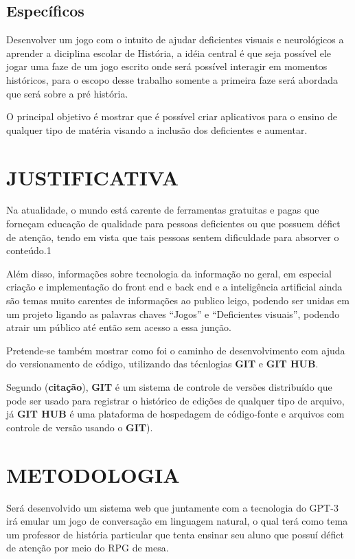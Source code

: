 \subsection{Específicos}
\label{sec:Especificos}
Desenvolver um jogo com o intuito de ajudar deficientes visuais e neurológicos a aprender a diciplina escolar de História, a idéia central é que seja possível ele jogar uma faze de um jogo escrito onde será possível interagir em momentos históricos, para o escopo desse trabalho somente a primeira faze será abordada que será sobre a pré história. 

O principal objetivo é mostrar que é possível criar aplicativos para o ensino de qualquer tipo de matéria visando a inclusão dos deficientes e aumentar.

\section{JUSTIFICATIVA}
\label{sec:Justificativa}

Na atualidade, o mundo está carente de ferramentas gratuitas e pagas que forneçam educação de qualidade para pessoas deficientes ou que possuem défict de atenção, tendo em vista que tais pessoas sentem dificuldade para absorver o conteúdo.1 

Além disso, informações sobre tecnologia da informação no geral, em especial criação e implementação do front end e back end e a inteligência artificial ainda são temas muito carentes de informações ao publico leigo, podendo ser unidas em um projeto ligando as palavras chaves “Jogos” e “Deficientes visuais”, podendo atrair um público até então sem acesso a essa junção. 

Pretende-se também mostrar como foi o caminho de desenvolvimento com ajuda do versionamento de código, utilizando das técnlogias \textbf{GIT} e \textbf{GIT HUB}. 

Segundo (\textbf{citação}), \textbf{GIT} é um sistema de controle de versões
distribuído que pode ser usado para registrar o histórico de edições de qualquer tipo
de arquivo, já \textbf{GIT HUB} é uma plataforma de hospedagem de código-fonte e
arquivos com controle de versão usando o \textbf{GIT}).  

\section{METODOLOGIA}
\label{sec:METODOLOGIA}
Será desenvolvido um sistema web que juntamente com a tecnologia do GPT-3 irá emular um jogo de conversação em linguagem natural, o qual terá como tema um professor de história particular que tenta ensinar seu aluno que possuí défict de atenção por meio do RPG de mesa.   


